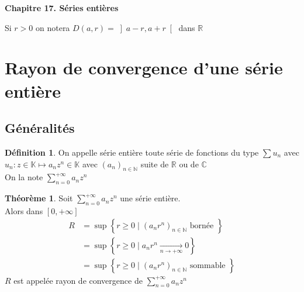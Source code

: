\documentclass[10pt,a4paper]{article}
\theoremstyle{definition}
\newtheorem{theorem}[proposition]{Théorème}
\newtheorem{definition}[proposition]{Définition}
\begin{document}
\renewcommand{\labelitemi}{\textbullet}
\renewcommand{\labelenumi}{(\roman{enumi})}

\begin{center}
{\Large \textbf{Chapitre 17. Séries entières}}
\end{center}

\noindent Si \(r > 0\) on notera \(D(a, r) = \left] a - r, a + r \right[ \) dans \(\mathbb{R}\)

\section{Rayon de convergence d'une série entière}
\subsection{Généralités}
\begin{definition}
    On appelle série entière toute série de fonctions du type \(\sum u_n\) avec \(u_n: z \in \mathbb{K} \mapsto a_n z^n \in \mathbb{K}\)
    avec \((a_n)_{n \in \mathbb{N}}\) suite de \(\mathbb{R}\) ou de \(\mathbb{C}\) \\
    On la note \(\sum\limits_{n = 0}^{+\infty} a_n z^n\)
\end{definition}
\begin{theorem}
    Soit \(\sum\limits_{n = 0}^{+\infty} a_n z^n\) une série entière. \\
    Alors dans \([0, +\infty]\)
    \begin{align*}
        R &= \sup \left\{r \geq 0 \mid (a_n r^n)_{n \in \mathbb{N}} \text{ bornée }\right\} \\
        &= \sup \left\{r \geq 0 \mid a_n r^n \xrightarrow[n \to +\infty]{}0 \right\} \\
        &= \sup \left\{r \geq 0 \mid (a_n r^n)_{n \in \mathbb{N}} \text{ sommable } \right\}
    \end{align*}
    \(R\) est appelée rayon de convergence de \(\sum\limits_{n = 0}^{+\infty} a_n z^n\)
\end{theorem}

\renewcommand{\labelenumi}{\arabic{enumi}.}
\end{document}
